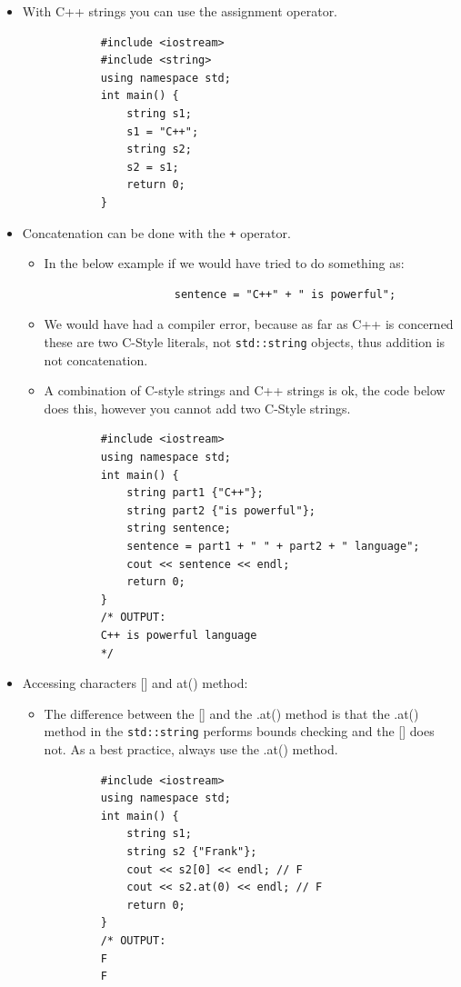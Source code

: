 \begin{itemize}
    \item With C++ strings you can use the assignment operator.
        \begin{verbatim}
            #include <iostream>
            #include <string>
            using namespace std;
            int main() {
                string s1;
                s1 = "C++";
                string s2;
                s2 = s1;
                return 0;
            }
        \end{verbatim}
    
    \item Concatenation can be done with the \texttt{+} operator.
        \begin{itemize}
            \item In the below example if we would have tried to do something as:
                \begin{verbatim}
                    sentence = "C++" + " is powerful";
                \end{verbatim}
            \item We would have had a compiler error, because as far as C++ is concerned these are two C-Style literals, not \texttt{std::string} objects, thus addition is not concatenation.
            \item A combination of C-style strings and C++ strings is ok, the code below does this, however you cannot add two C-Style strings.
        \end{itemize}
        \begin{verbatim}
            #include <iostream>
            using namespace std;
            int main() {
                string part1 {"C++"};
                string part2 {"is powerful"};
                string sentence;
                sentence = part1 + " " + part2 + " language";
                cout << sentence << endl;
                return 0;
            }
            /* OUTPUT:
            C++ is powerful language
            */
        \end{verbatim}
    
    \item Accessing characters [] and at() method:
        \begin{itemize}
            \item The difference between the [] and the .at() method is that the .at() method in the \texttt{std::string} performs bounds checking and the [] does not. As a best practice, always use the .at() method.
        \end{itemize}
        \begin{verbatim}
            #include <iostream>
            using namespace std;
            int main() {
                string s1;
                string s2 {"Frank"};
                cout << s2[0] << endl; // F
                cout << s2.at(0) << endl; // F
                return 0;
            }
            /* OUTPUT:
            F
            F


\end{verbatim}
\end{itemize}
